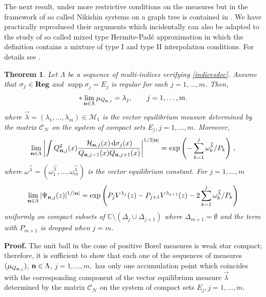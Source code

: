 \documentclass{amsart}
\newtheorem{teo}{\sc Theorem}[section]
\theoremstyle{definition}
\theoremstyle{remark}
\newcommand{\supp}{\operatorname{supp }}
\begin{document}
The next result, under more restrictive conditions on the measures but in the framework of so called Nikishin systems on a graph tree is contained in \cite{GRS}. We have practically reproduced their arguments which incidentally can also be adapted to the study of so called mixed type Hermite-Pad\'e approximation in which the definition contains a mixture of type I and type II interpolation conditions. For details see \cite{FLLS}.


 \begin{teo} \label{teo4} Let $\Lambda$ be a sequence of multi-indices verifying \eqref{indicesdec}. Assume that $\sigma_j \in \mbox{\bf Reg}$ and $\supp{\sigma_j} = E_j$ is regular for each $j=1,\ldots,m$. Then,
\begin{equation} \label{weak}
*\lim_{{\bf n}\in \Lambda} \mu_{Q_{{\bf n},j}} =  {\lambda}_{j}, \qquad j=1,\ldots,m.
\end{equation}
where $\vec{\lambda} = (\lambda_1,\ldots,\lambda_m) \in
\mathcal{M}_1$ is the vector equilibrium measure determined by the
matrix $\mathcal{C}_{\mathcal{N}}$ on the system of compact
sets $E_j, j=1,\ldots,m$.  Moreover,
\begin{equation} \label{eq:4*}
\lim_{{\bf n}\in \Lambda} \left|\int  {Q_{{\bf n},j}^2(x)}\frac{\mathcal{H}_{{\bf n},j}(x)\,{\rm d}\sigma_j(x)}{Q_{{\bf n},j-1}(x)Q_{{\bf n},j+1}(x)} \right|^{1/2|{\bf n}|} = \exp\left(-\sum_{k=1}^{j}
{\omega_k^{\vec{\lambda}}/P_k} \right) \,,
\end{equation}
where  $\omega^{\vec{\lambda}} = (\omega_1^{\vec{\lambda}},\ldots,\omega_m^{\vec{\lambda}})$ is the vector equilibrium constant. For $j=1,\ldots,m$
\begin{equation} \label{asint1}
\lim_{{\bf n}\in \Lambda} |\Psi_{{\bf n},j}(z)|^{1/|{\bf n}|} = \exp\left(P_j V^{{\lambda}_{j}}(z)- P_{j+1}V^{ {\lambda}_{j+1}}(z)-2 \sum_{k=1}^{j}
{\omega_k^{\vec{\lambda}}/P_k} \right)
\end{equation}
uniformly on compact subsets of $\mathbb{C} \setminus (\Delta_j \cup \Delta_{j+1})$ where $\Delta_{m+1} = \emptyset$ and the term with $P_{m+1}$ is dropped when $j=m$.
\end{teo}
{\bf Proof.} The unit ball in the cone of positive Borel measures
is weak star compact; therefore, it is sufficient to show that
each one of the sequences of measures $(\mu_{Q_{{\bf n},j}})$,
${\bf n}\in\Lambda$, $j=1,\ldots,m,$ has only one
accumulation point which coincides with the corresponding
component of the vector equilibrium measure $\vec{\lambda}$ determined by the
matrix $\mathcal{C}_{\mathcal{N}}$ on the system of compact
sets $E_j, j=1,\ldots,m$.
\end{document}
